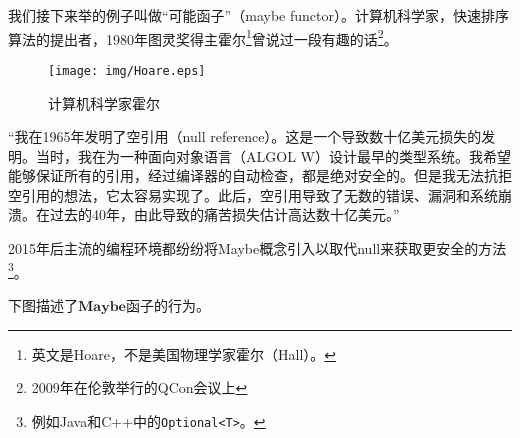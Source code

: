 \documentclass{article}
\begin{document}
\begin{example}
 
我们接下来举的例子叫做“可能函子”（maybe functor）。计算机科学家，快速排序算法的提出者，1980年图灵奖得主霍尔\footnote{英文是Hoare，不是美国物理学家霍尔（Hall）。}曾说过一段有趣的话\footnote{2009年在伦敦举行的QCon会议上}。

\begin{figure}[htbp]
 \centering
 \texttt{[image: img/Hoare.eps]}
 \captionsetup{labelformat=empty}
 \caption{计算机科学家霍尔}
 \label{fig:Hoare}
\end{figure}

“我在1965年发明了空引用（null reference）。这是一个导致数十亿美元损失的发明。当时，我在为一种面向对象语言（ALGOL W）设计最早的类型系统。我希望能够保证所有的引用，经过编译器的自动检查，都是绝对安全的。但是我无法抗拒空引用的想法，它太容易实现了。此后，空引用导致了无数的错误、漏洞和系统崩溃。在过去的40年，由此导致的痛苦损失估计高达数十亿美元。”\cite{Wiki-Hoare}


2015年后主流的编程环境都纷纷将Maybe概念引入以取代null来获取更安全的方法\footnote{例如Java和C++中的\texttt{Optional<T>}。}。

下图描述了$\mathbf{Maybe}$函子的行为。

\begin{center}
\end{center}


\end{example}
\end{document}
